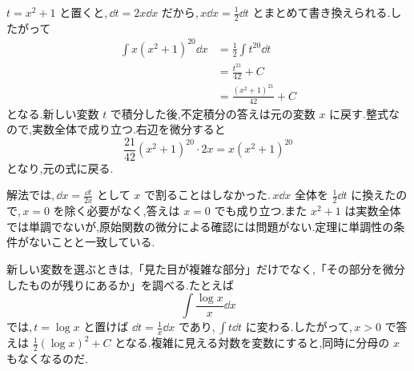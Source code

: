 $t=x^2+1$ と置くと,\,$\dd t=2x\dd x$ だから,\,$x\dd x=\frac12\dd t$ とまとめて書き換えられる.したがって
\begin{align*}
 \int x(x^2+1)^{20}\dd x
 &=\frac12\int t^{20}\dd t\\
 &=\frac{t^{21}}{42}+C\\
 &=\frac{(x^2+1)^{21}}{42}+C
\end{align*}
となる.新しい変数 $t$ で積分した後,不定積分の答えは元の変数 $x$ に戻す.整式なので,実数全体で成り立つ.右辺を微分すると
\[
 \frac{21}{42}(x^2+1)^{20}\cdot2x
 =x(x^2+1)^{20}
\]
となり,元の式に戻る.

解法では,\,$\dd x=\frac{\dd t}{2x}$ として $x$ で割ることはしなかった.\,$x\dd x$ 全体を $\frac12\dd t$ に換えたので,\,$x=0$ を除く必要がなく,答えは $x=0$ でも成り立つ.また $x^2+1$ は実数全体では単調でないが,原始関数の微分による確認には問題がない.定理に単調性の条件がないことと一致している.

新しい変数を選ぶときは,「見た目が複雑な部分」だけでなく,「その部分を微分したものが残りにあるか」を調べる.たとえば
\[
 \int\frac{\log x}{x}\dd x
\]
では,\,$t=\log x$ と置けば $\dd t=\frac1x\dd x$ であり,\,$\int t\dd t$ に変わる.したがって,\,$x>0$ で答えは $\frac12(\log x)^2+C$ となる.複雑に見える対数を変数にすると,同時に分母の $x$ もなくなるのだ.
